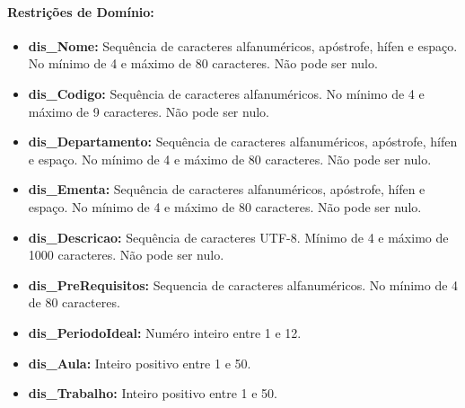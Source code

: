 \documentclass{report}
\begin{document}
\paragraph{Restrições de Domínio:}
\begin{itemize}
  \item \textbf{dis\_Nome:} Sequência de caracteres alfanuméricos, apóstrofe, hífen e espaço. No mínimo de 4 e máximo de 80 caracteres. Não pode ser nulo.
  \item \textbf{dis\_Codigo:}  Sequência de caracteres alfanuméricos. No mínimo de 4 e máximo de 9 caracteres. Não pode ser nulo.
  \item \textbf{dis\_Departamento:} Sequência de caracteres alfanuméricos, apóstrofe, hífen e espaço. No mínimo de 4 e máximo de 80 caracteres. Não pode ser nulo.
  \item \textbf{dis\_Ementa:} Sequência de caracteres alfanuméricos, apóstrofe, hífen e espaço. No mínimo de 4 e máximo de 80 caracteres. Não pode ser nulo.
  \item \textbf{dis\_Descricao:} Sequência de caracteres UTF-8. Mínimo de 4 e máximo de 1000 caracteres. Não pode ser nulo.
  \item \textbf{dis\_PreRequisitos:} Sequencia de caracteres alfanuméricos. No mínimo de 4 de 80 caracteres. 
  \item \textbf{dis\_PeriodoIdeal:}  Numéro inteiro entre 1 e 12.
  \item \textbf{dis\_Aula:} Inteiro positivo entre 1 e 50.
  \item \textbf{dis\_Trabalho:} Inteiro positivo entre 1 e 50.
\end{itemize}
\end{document}
